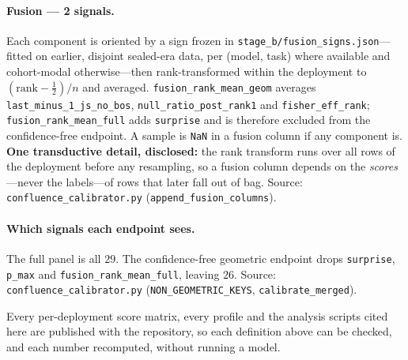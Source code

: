 \documentclass[11pt]{article}
\begin{document}
\paragraph{Fusion --- 2 signals.} Each component is oriented by a sign frozen in
\texttt{stage\_b/fusion\_signs.json}---fitted on earlier, disjoint sealed-era data, per (model, task)
where available and cohort-modal otherwise---then rank-transformed within the deployment to
$(\mathrm{rank}-\tfrac12)/n$ and averaged. \texttt{fusion\_rank\_mean\_geom} averages
\texttt{last\_minus\_1\_js\_no\_bos}, \texttt{null\_ratio\_post\_rank1} and
\texttt{fisher\_eff\_rank}; \texttt{fusion\_rank\_mean\_full} adds \texttt{surprise} and is therefore
excluded from the confidence-free endpoint. A sample is \texttt{NaN} in a fusion column if any
component is. \textbf{One transductive detail, disclosed:} the rank transform runs over all rows of
the deployment before any resampling, so a fusion column depends on the \emph{scores}---never the
labels---of rows that later fall out of bag. Source: \texttt{confluence\_calibrator.py}
(\texttt{append\_fusion\_columns}).

\paragraph{Which signals each endpoint sees.} The full panel is all $29$. The confidence-free
geometric endpoint drops \texttt{surprise}, \texttt{p\_max} and \texttt{fusion\_rank\_mean\_full},
leaving $26$. Source: \texttt{confluence\_calibrator.py} (\texttt{NON\_GEOMETRIC\_KEYS},
\texttt{calibrate\_merged}).

Every per-deployment score matrix, every profile and the analysis scripts cited here are published
with the repository, so each definition above can be checked, and each number recomputed, without
running a model.
\end{document}
